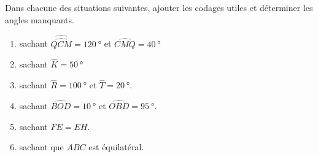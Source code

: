 
\begin{exercice}\label{exo2smath-0070}

    Dans chacune des situations suivantes, ajouter les codages utiles et déterminer les angles manquants.
    \begin{enumerate}
        \item
   sachant
   \( \hat \widehat{QCM}=\SI{120}{\degree}\) et \( \widehat{CMQ}=\SI{40}{\degree}\)
\item
    sachant \( \hat{K}=\SI{50}{\degree}\)
\item
    sachant \( \hat{R}=\SI{100}{\degree}\) et \( \hat{T}=\SI{20}{\degree}\).
\item
    sachant \( \widehat{BOD}=\SI{10}{\degree}\) et \( \widehat{OBD}=\SI{95}{\degree}\).
\item
   sachant \( FE=EH\).
\item
   sachant que \( ABC\) est équilatéral.
            
    \end{enumerate}

\end{exercice}
